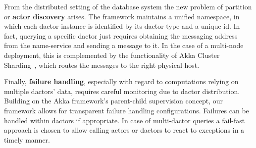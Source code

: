     From the distributed setting of the database system the new problem of partition or \textbf{actor discovery} arises.
    The framework maintains a unified namespace, in which each \gls{dactor} instance is identified by its \gls{dactor} type and a unique id.
    In fact, querying a specific \gls{dactor} just requires obtaining the messaging address from the name-service and sending a message to it.
    In the case of a multi-node deployment, this is complemented by the functionality of Akka Cluster Sharding~\cite{akka:clustersharding}, which routes the messages to the right physical host.
    
    Finally, \textbf{failure handling}, especially with regard to computations relying on multiple \glspl{dactor}' data, requires careful monitoring due to \gls{dactor} distribution.
    Building on the Akka framework's parent-child supervision concept, our framework allows for transparent failure handling configurations.
    Failures can be handled within \glspl{dactor} if appropriate.
    In case of multi-\gls{dactor} queries a fail-fast approach is chosen to allow calling actors or \glspl{dactor} to react to exceptions in a timely manner.
